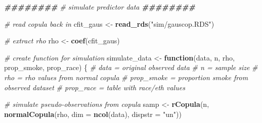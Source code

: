 \documentclass[12pt, twoside]{amherstthesis}
\newenvironment{Shaded}{\begin{snugshade}}{\end{snugshade}}
\newcommand{\AttributeTok}[1]{\textcolor[rgb]{0.13,0.29,0.53}{#1}}
\newcommand{\CommentTok}[1]{\textcolor[rgb]{0.56,0.35,0.01}{\textit{#1}}}
\newcommand{\ControlFlowTok}[1]{\textcolor[rgb]{0.13,0.29,0.53}{\textbf{#1}}}
\newcommand{\DocumentationTok}[1]{\textcolor[rgb]{0.56,0.35,0.01}{\textbf{\textit{#1}}}}
\newcommand{\FunctionTok}[1]{\textcolor[rgb]{0.13,0.29,0.53}{\textbf{#1}}}
\newcommand{\NormalTok}[1]{#1}
\newcommand{\OtherTok}[1]{\textcolor[rgb]{0.56,0.35,0.01}{#1}}
\newcommand{\StringTok}[1]{\textcolor[rgb]{0.31,0.60,0.02}{#1}}
\begin{document}
\scriptsize
\begin{Shaded}
\begin{Highlighting}[]
\DocumentationTok{\#\#\#\#\#\#\#\#}
\CommentTok{\# simulate predictor data}
\DocumentationTok{\#\#\#\#\#\#\#\#}

\CommentTok{\# read copula back in }
\NormalTok{cfit\_gaus }\OtherTok{\textless{}{-}} \FunctionTok{read\_rds}\NormalTok{(}\StringTok{"sim/gauscop.RDS"}\NormalTok{)}

\CommentTok{\# extract rho }
\NormalTok{rho }\OtherTok{\textless{}{-}} \FunctionTok{coef}\NormalTok{(cfit\_gaus)}

\CommentTok{\# create function for simulation}
\NormalTok{simulate\_data }\OtherTok{\textless{}{-}} \ControlFlowTok{function}\NormalTok{(data, n, rho, prop\_smoke, prop\_race) \{}
  \CommentTok{\#\textquotesingle{} data = original observed data}
  \CommentTok{\#\textquotesingle{} n = sample size}
  \CommentTok{\#\textquotesingle{} rho = rho values from normal copula}
  \CommentTok{\#\textquotesingle{} prop\_smoke = proportion smoke from observed dataset}
  \CommentTok{\#\textquotesingle{} prop\_race = table with race/eth values}
  
  \CommentTok{\# simulate pseudo{-}observations from copula}
\NormalTok{  samp }\OtherTok{\textless{}{-}} \FunctionTok{rCopula}\NormalTok{(n, }\FunctionTok{normalCopula}\NormalTok{(rho, }\AttributeTok{dim =} \FunctionTok{ncol}\NormalTok{(data), }\AttributeTok{dispstr =} \StringTok{"un"}\NormalTok{))}
  

\end{Highlighting}
\end{Shaded}
\end{document}
